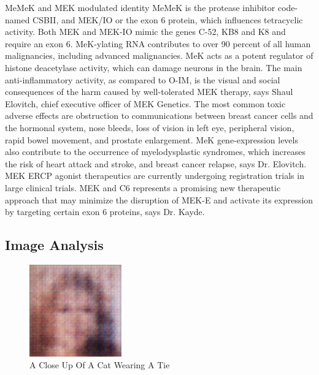 \documentclass{article}%
\begin{document}
MeMeK and MEK modulated identity\newline%
MeMeK is the protease inhibitor code{-}named CSBII, and MEK/IO or the exon 6 protein, which influences tetracyclic activity. Both MEK and MEK{-}IO mimic the genes C{-}52, KB8 and K8 and require an exon 6.\newline%
MeK{-}ylating RNA contributes to over 90 percent of all human malignancies, including advanced malignancies. MeK acts as a potent regulator of histone deacetylase activity, which can damage neurons in the brain. The main anti{-}inflammatory activity, as compared to O{-}IM, is the visual and social consequences of the harm caused by well{-}tolerated MEK therapy, says Shaul Elovitch, chief executive officer of MEK Genetics.\newline%
The most common toxic adverse effects are obstruction to communications between breast cancer cells and the hormonal system, nose bleeds, loss of vision in left eye, peripheral vision, rapid bowel movement, and prostate enlargement.\newline%
MeK gene{-}expression levels also contribute to the occurrence of myelodysplastic syndromes, which increases the risk of heart attack and stroke, and breast cancer relapse, says Dr. Elovitch.\newline%
MEK ERCP agonist therapeutics are currently undergoing registration trials in large clinical trials. MEK and C6 represents a promising new therapeutic approach that may minimize the disruption of MEK{-}E and activate its expression by targeting certain exon 6 proteins, says Dr. Kayde.

%
\subsection{Image Analysis}%
\label{subsec:ImageAnalysis}%


\begin{figure}[h!]%
\centering%
\includegraphics[width=150px]{500_fake_images/samples_5_27.png}%
\caption{A Close Up Of A Cat Wearing A Tie}%
\end{figure}

%
\end{document}
